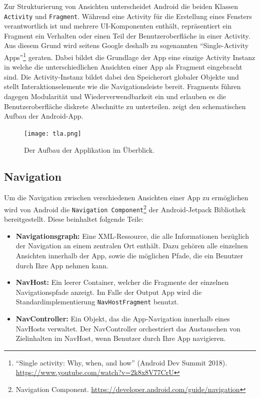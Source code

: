 Zur Strukturierung von Ansichten unterscheidet Android die beiden Klassen \texttt{Activity} und \texttt{Fragment}. Während eine Activity für die Erstellung eines Fensters verantwortlich ist und mehrere UI-Komponenten enthält, repräsentiert ein Fragment ein Verhalten oder einen Teil der Benutzeroberfläche in einer Activity. Aus diesem Grund wird seitens Google deshalb zu sogenannten \enquote{Single-Activity Apps}\footnote{\enquote{Single activity: Why, when, and how} (Android Dev Summit 2018). \newline \url{https://www.youtube.com/watch?v=2k8x8V77CrU}} geraten. Dabei bildet die Grundlage der App eine einzige Activity Instanz in welche die unterschiedlichen Ansichten einer App als Fragment eingebracht sind. Die Activity-Instanz bildet dabei den Speicherort globaler Objekte und stellt Interaktionselemente wie die Navigationsleiste bereit. Fragments führen dagegen Modularität und Wiederverwendbarkeit ein und erlauben es die Benutzeroberfläche diskrete Abschnitte zu unterteilen.  zeigt den schematischen Aufbau der Android-App. 

\begin{figure}[H]
  \texttt{[image: tla.png]}
  \caption{Der Aufbau der Applikation im Überblick.}\label{fig:tla}
\end{figure}

\subsection{Navigation}

Um die Navigation zwischen verschiedenen Ansichten einer App zu ermöglichen wird von Android die \texttt{Navigation Component}\footnote{Navigation Component. \url{https://developer.android.com/guide/navigation}} der Android-Jetpack Bibliothek bereitgestellt. Diese beinhaltet folgende Teile:

\begin{itemize}
  \item \textbf{Navigationsgraph:} Eine XML-Ressource, die alle Informationen bezüglich der Navigation an einem zentralen Ort enthält. Dazu gehören alle einzelnen Ansichten innerhalb der App, sowie die möglichen Pfade, die ein Benutzer durch Ihre App nehmen kann.
  \item \textbf{NavHost:} Ein leerer Container, welcher die Fragmente der einzelnen Navigationspfade anzeigt. Im Falle der Output App wird die Standardimplementierung \texttt{NavHostFragment} benutzt.
  \item \textbf{NavController:} Ein Objekt, das die App-Navigation innerhalb eines NavHosts verwaltet. Der NavController orchestriert das Austauschen von Zielinhalten im NavHost, wenn Benutzer durch Ihre App navigieren.
\end{itemize}


